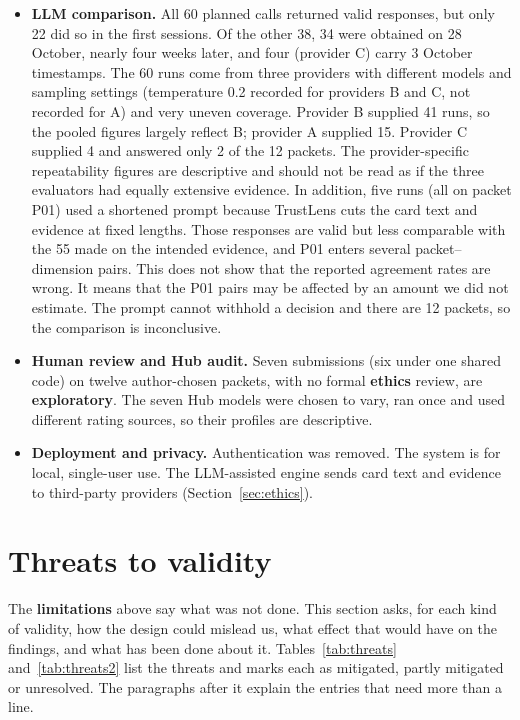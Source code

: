 \begin{itemize}[itemsep=0.1em]
\item \textbf{LLM comparison.} All 60 planned calls returned valid responses, but only 22 did so in the first sessions. Of the other 38, 34 were obtained on 28 October, nearly four weeks later, and four (provider C) carry 3 October timestamps. The 60 runs come from three providers with different models and sampling settings (temperature 0.2 recorded for providers B and C, not recorded for A) and very uneven coverage. Provider B supplied 41 runs, so the pooled figures largely reflect B; provider A supplied 15. Provider C supplied 4 and answered only 2 of the 12 packets. The provider-specific repeatability figures are descriptive and should not be read as if the three evaluators had equally extensive evidence. In addition, five runs (all on packet P01) used a shortened prompt because TrustLens cuts the card text and evidence at fixed lengths. Those responses are valid but less comparable with the 55 made on the intended evidence, and P01 enters several packet--dimension pairs. This does not show that the reported agreement rates are wrong. It means that the P01 pairs may be affected by an amount we did not estimate. The prompt cannot withhold a decision and there are 12 packets, so the comparison is inconclusive.
\item \textbf{Human review and Hub audit.} Seven submissions (six under one shared code) on twelve author-chosen packets, with no formal \textbf{ethics} review, are \textbf{exploratory}. The seven Hub models were chosen to vary, ran once and used different rating sources, so their profiles are descriptive.
\item \textbf{Deployment and privacy.} Authentication was removed. The system is for local, single-user use. The LLM-assisted engine sends card text and evidence to third-party providers (Section~\ref{sec:ethics}).
\end{itemize}

\section{Threats to validity}\label{sec:threats}
The \textbf{limitations} above say what was not done. This section asks, for each kind of validity, how the design could mislead us, what effect that would have on the findings, and what has been done about it. Tables~\ref{tab:threats} and~\ref{tab:threats2} list the threats and marks each as mitigated, partly mitigated or unresolved. The paragraphs after it explain the entries that need more than a line.

